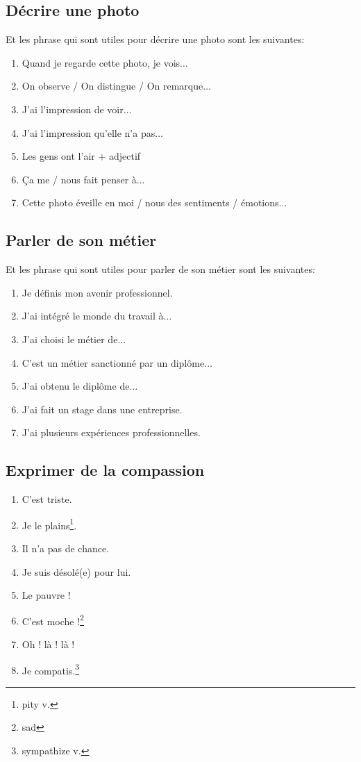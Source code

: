 \documentclass[math,code]{amznotes}
\theoremstyle{remark}
\begin{document}
\subsection*{Décrire une photo}

Et les phrase qui sont utiles pour décrire une photo sont les suivantes:

\begin{enumerate}
    \item Quand je regarde cette photo, je vois$\dots$
    \item On observe / On distingue / On remarque$\dots$
    \item J'ai l'impression de voir$\dots$
    \item J'ai l'impression qu'elle n'a pas$\dots$
    \item Les gens ont l'air + adjectif
    \item Ça me / nous fait penser à$\dots$
    \item Cette photo éveille en moi / nous des sentiments / émotions$\dots$
\end{enumerate}

\subsection*{Parler de son métier}

Et les phrase qui sont utiles pour parler de son métier sont les suivantes:

\begin{enumerate}
    \item Je définis mon avenir professionnel.
    \item J'ai intégré le monde du travail à$\dots$
    \item J'ai choisi le métier de$\dots$
    \item C'est un métier sanctionné par un diplôme$\dots$
    \item J'ai obtenu le diplôme de$\dots$
    \item J'ai fait un stage dans une entreprise.
    \item J'ai plusieurs expériences professionnelles.
\end{enumerate}

\subsection*{Exprimer de la compassion}

\begin{enumerate}
    \item C'est triste.
    \item Je le plains\footnote{pity v.}.
    \item Il n'a pas de chance.
    \item Je suis désolé(e) pour lui.
    \item Le pauvre !
    \item C'est moche !\footnote{sad}
    \item Oh ! là ! là !
    \item Je compatis.\footnote{sympathize v.}
\end{enumerate}
\end{document}
